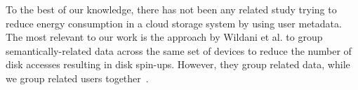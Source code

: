 To the best of our knowledge, there has not been any related study trying to reduce energy consumption in 
a cloud storage system by using user metadata. The most relevant to our work is the approach by Wildani et al.
to group semantically-related data across the same set of devices to reduce the number of disk accesses resulting
in disk spin-ups. However, they group related data, while we group related users together~\cite{5668053}.

